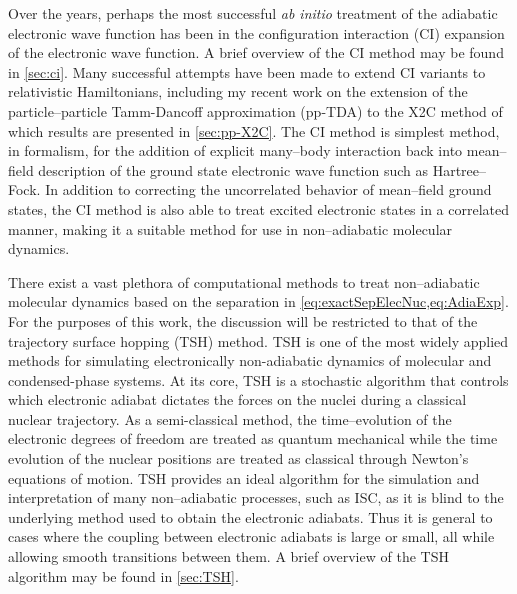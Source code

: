 Over the years, perhaps the most successful \emph{ab initio} treatment of the
adiabatic electronic wave function has been in the configuration interaction
(CI) expansion of the electronic wave function.
\cite{Meyer00_PR1,Knowles88_JCP1,Handy82_JCP1,Saalfrank04_JCP124102,
Schlegel92_CPL524,Handy84_CPL315,Joergensen78_JCP3833,Fleig08_JCP014108}
A brief overview of the CI method may be found in \cref{sec:ci}.  Many
successful attempts have been made to extend CI variants to relativistic
Hamiltonians\cite{Neese13_JCP104113, Olsen97_TCA125, Jensen96_JCP4083,
Fleig08_JCP014108}, including my recent work on the extension of the
particle--particle Tamm-Dancoff approximation (pp-TDA) to the X2C method
\cite{DBWY16_Accepted1} of which results are presented in \cref{sec:pp-X2C}. The
CI method is simplest method, in formalism, for the addition of explicit
many--body interaction back into mean--field description of the ground state
electronic wave function such as Hartree--Fock. In addition to correcting the
uncorrelated behavior of mean--field ground states, the CI method is also able
to treat excited electronic states in a correlated manner, making it a suitable
method for use in non--adiabatic molecular dynamics.

There exist a vast plethora of computational methods to treat non--adiabatic
molecular dynamics based on the separation in
\cref{eq:exactSepElecNuc,eq:AdiaExp}.
\cite{Meyer00_PR1,Li11_144102,Li05_084106,Preston71_562}
For the purposes of this work, the discussion will be restricted to that of the
trajectory surface hopping (TSH) method.  TSH is one of the most widely applied
methods for simulating electronically non-adiabatic dynamics of molecular and
condensed-phase systems.\cite{Barbatti11_1759, Tavernelli14_62, Tully12_22A301,
Tully98_407, Hynes14_97} At its core, TSH is a stochastic algorithm that
controls which electronic adiabat dictates the forces on the nuclei during a
classical nuclear trajectory.\cite{Preston71_562} As a semi-classical method,
the time--evolution of the electronic degrees of freedom are treated as quantum
mechanical while the time evolution of the nuclear positions are treated as
classical through Newton's equations of motion. 
TSH provides an ideal algorithm for the simulation and interpretation of many
non--adiabatic processes, such as ISC, as it is blind to the underlying method
used to obtain the electronic adiabats. Thus it is general to cases where the
coupling between electronic adiabats is large or small, all while allowing
smooth transitions between them. A brief overview of the TSH algorithm may be
found in \cref{sec:TSH}. 


